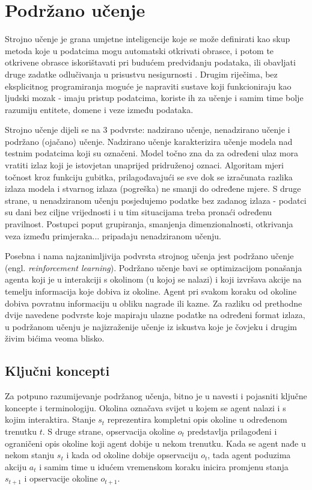 \chapter{Podržano učenje}

Strojno učenje  je grana umjetne inteligencije  koje se može definirati kao skup metoda koje u podatcima mogu automatski otkrivati obrasce, i potom te otkrivene obrasce iskorištavati pri budućem predviđanju podataka, ili obavljati druge zadatke odlučivanja u prisustvu nesigurnosti \cite{CupicUvod}. Drugim riječima, bez eksplicitnog programiranja moguće je napraviti sustave koji funkcioniraju kao ljudski mozak - imaju pristup podatcima, koriste ih za učenje i samim time bolje razumiju entitete, domene i veze između podataka. 

Strojno učenje dijeli se na 3 podvrste: nadzirano učenje, nenadzirano učenje i podržano (ojačano) učenje. Nadzirano učenje  karakterizira učenje modela nad testnim podatcima koji su označeni. Model točno zna da za određeni ulaz mora vratiti izlaz koji je istovjetan unaprijed pridruženoj oznaci. Algoritam mjeri točnost kroz funkciju gubitka, prilagođavajući se sve dok se izračunata razlika izlaza modela i stvarnog izlaza (pogreška) ne smanji do određene mjere. S druge strane, u nenadziranom učenju  posjedujemo podatke bez zadanog izlaza - podatci su dani bez ciljne vrijednosti i u tim situacijama treba pronaći određenu pravilnost. Postupci poput grupiranja, smanjenja dimenzionalnosti, otkrivanja veza između primjeraka... pripadaju nenadziranom učenju.

Posebna i nama najzanimljivija podvrsta strojnog učenja jest podržano učenje (engl. \textit{reinforcement learning}). Podržano učenje bavi se optimizacijom ponašanja agenta koji je u interakciji s okolinom (u kojoj se nalazi) i koji izvršava akcije na temelju informacija koje dobiva iz okoline. Agent pri svakom koraku od okoline dobiva povratnu informaciju u obliku nagrade ili kazne. Za razliku od prethodne dvije navedene podvrste koje mapiraju ulazne podatke na određeni format izlaza, u podržanom učenju je najizraženije učenje iz iskustva koje je čovjeku i drugim živim bićima veoma blisko.

\section{Ključni koncepti}

Za potpuno razumijevanje podržanog učenja, bitno je u navesti i pojasniti ključne koncepte i terminologiju. Okolina  označava svijet u kojem se agent nalazi i s kojim interaktira. Stanje $s_t$  reprezentira kompletni opis okoline u određenom trenutku $t$. S druge strane, opservacija okoline $o_t$  predstavlja prilagođeni i ograničeni opis okoline koji agent dobije u nekom trenutku. Kada se agent nađe u nekom stanju $s_t$ i kada od okoline dobije opservaciju $o_t$, tada agent poduzima akciju $a_t$  i samim time u idućem vremenskom koraku inicira promjenu stanja $s_{t+1}$ i opservacije okoline $o_{t+1}$. 

